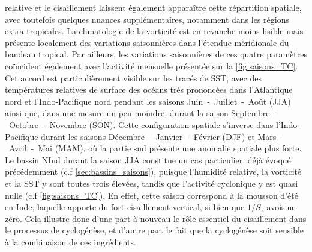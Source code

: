 \documentclass[../main.tex]{subfiles}
\begin{document}
relative et le cisaillement laissent également apparaître cette répartition spatiale, avec toutefois quelques nuances supplémentaires, notamment dans les
régions extra tropicales. La climatologie de la vorticité est en revanche moins lisible mais présente localement des variations saisonnières dans l'étendue
méridionale du bandeau tropical. Par ailleurs, les variations saisonnières de ces quatre paramètres coïncident également avec l'activité mensuelle présentée sur
la \cref{fig:saisons_TC}. Cet accord est particulièrement visible sur les tracés de SST, avec des températures relatives de surface des océans très prononcées
dans l'Atlantique nord et l'Indo-Pacifique nord pendant les saisons Juin~-~Juillet~-~Août (JJA) ainsi que, dans une mesure un peu moindre, durant la saison
Septembre~-~Octobre~-~Novembre (SON). Cette configuration spatiale s'inverse dans l'Indo-Pacifique durant les saisons Décembre~-~Janvier~-~Février (DJF) et
Mars~-~Avril~-~Mai (MAM), où la partie sud présente une anomalie spatiale plus forte. Le bassin NInd durant la saison JJA constitue un cas particulier, déjà
évoqué précédemment (c.f \cref{sec:bassins_saisons}), puisque l'humidité relative, la vorticité et la SST y sont toutes trois élevées, tandis que l'activité
cyclonique y est quasi nulle (c.f \cref{fig:saisons_TC}). En effet, cette saison correspond à la mousson d'été en Inde, laquelle apporte du fort cisaillement
vertical, si bien que $1/S_z$ avoisine zéro. Cela illustre donc d'une part à nouveau le rôle essentiel du cisaillement dans le processus de cyclogénèse, et
d'autre part le fait que la cyclogénèse soit sensible à la combinaison de ces ingrédients.
\end{document}
